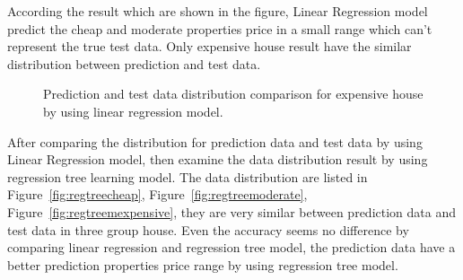 \documentclass[11pt,a4paper]{article}
\begin{document}
According the result which are shown in the figure, Linear Regression model predict the cheap and moderate properties price in a small range which can't represent the true test data. Only expensive house result have the similar distribution between prediction and test data.

\begin{figure}[h]
    \centering
    \hfill%
    \caption{Prediction and test data distribution comparison for expensive house by using linear regression model.}
    \label{fig:linearexpensive}
\end{figure}


\FloatBarrier
After comparing the distribution for prediction data and test data by using Linear Regression model, then examine the data distribution result by using regression tree learning model. The data distribution are listed in Figure~\ref{fig:regtreecheap}, Figure~\ref{fig:regtreemoderate}, Figure~\ref{fig:regtreemexpensive}, they are very similar between prediction data and test data in three group house. Even the accuracy seems no difference by comparing linear regression and regression tree model, the prediction data have a better prediction properties price range by using regression tree model.
\end{document}
